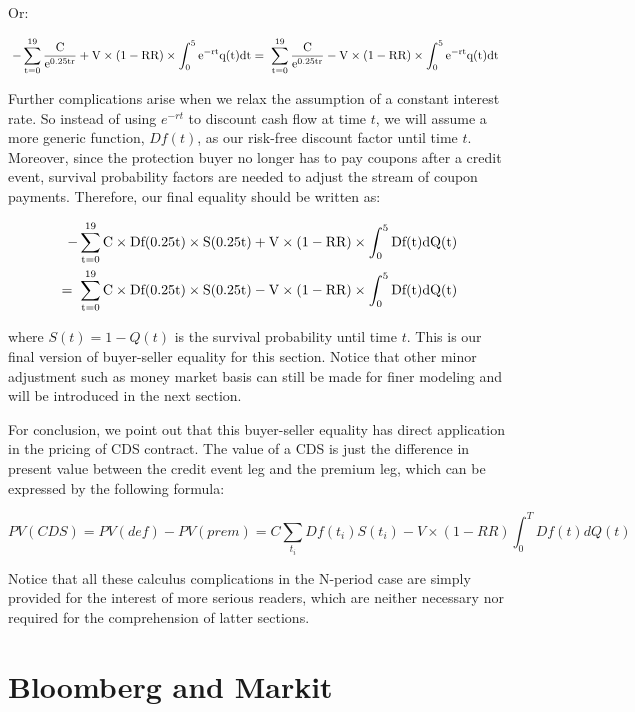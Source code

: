 \documentclass{jss}
\begin{document}
Or:

\begin{align}
  \rm \hspace{3pt}- \sum_{t = 0}^{19} \frac{C}{e^{0.25tr}} + V \times (1 - RR) \times \int_0^5 e^{-rt}q(t)dt  &= \rm \hspace{3pt} \sum_{t = 0}^{19} \frac{C}{e^{0.25tr}} - V \times (1 - RR) \times \int_0^5 e^{-rt}q(t)dt 
\end{align}

Further complications arise when we relax the assumption of a constant interest rate. So instead of using $e^{-rt}$ to discount cash flow at time $t$, we will assume a more generic function, $Df(t)$, as our risk-free discount factor until time $t$. Moreover, since the protection buyer no longer has to pay coupons after a credit event, survival probability factors are needed to adjust the stream of coupon payments. Therefore, our final equality should be written as:

\begin{align}
  \rm \hspace{3pt}- \sum_{t = 0}^{19} C\times Df(0.25t) \times S(0.25t) + V \times (1 - RR) \times \int_0^5 Df(t)dQ(t)  \\
  = \rm \hspace{3pt} \sum_{t = 0}^{19} C\times Df(0.25t) \times S(0.25t)  - V \times (1 - RR) \times \int_0^5 Df(t)dQ(t) 
\end{align}

where $S(t) = 1 - Q(t)$ is the survival probability until time $t$. This is our final version of buyer-seller equality for this section. Notice that other minor adjustment such as money market basis can still be made for finer modeling and will be introduced in the next section.

For conclusion, we point out that this buyer-seller equality has direct application in the pricing of CDS contract. The value of a CDS is just the difference in present value between the credit event leg and the premium leg, which can be expressed by the following formula:

$$PV(CDS) = PV(def) - PV(prem) = C\sum_{t_i}Df(t_i)S(t_i) - V\times(1 - RR)\int_0^T Df(t)dQ(t)$$

Notice that all these calculus complications in the N-period case are simply provided for the interest of more serious readers, which are neither necessary nor required for the comprehension of latter sections.


\section{Bloomberg and Markit}
\label{sec:BloombergMarkit}
\end{document}
